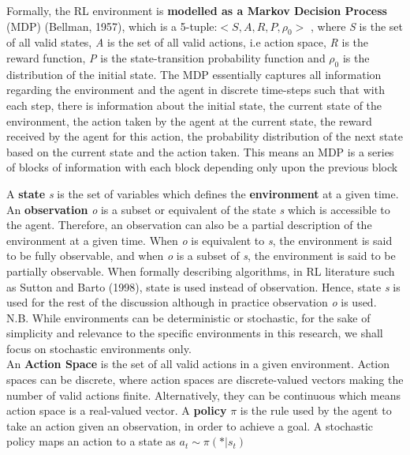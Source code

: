 Formally, the RL environment is \textbf{modelled as a Markov Decision Process} (MDP) (Bellman, 1957), which is a 5-tuple:$ <\textit{S},\textit{A},\textit{R},\textit{P},\rho_{0} > $ , where \textit{S} is the set of all valid states, \textit{A} is the set of all valid actions, i.e action space, \textit{R} is the reward function, \textit{P} is the state-transition probability function and $\rho_{0} $ is the distribution of the initial state. The MDP essentially captures all information regarding the environment and the agent in discrete time-steps such that with each step, there is information about the initial state, the current state of the environment, the action taken by the agent at the current state, the reward received by the agent for this action, the probability distribution of the next state based on the current state and the action taken. This means an MDP is a series of blocks of information with each block depending only upon the previous block 

A \textbf{state} \textit{s} is the set of variables which defines the \textbf{environment} at a given time. An \textbf{observation} \textit{o} is a subset or equivalent of the state \textit{s} which is accessible to the agent. Therefore, an observation can also be a partial description of the environment at a given time. When \textit{o} is equivalent to \textit{s}, the environment is said to be fully observable, and when \textit{o} is a subset of \textit{s}, the environment is said to be partially observable. When formally describing algorithms, in RL literature such as Sutton and Barto (1998), state is used instead of observation. Hence, state \textit{s} is used for the rest of the discussion although in practice observation \textit{o} is used. 
\\

N.B. While environments can be deterministic or stochastic, for the sake of simplicity and relevance to the specific environments in this research, we shall focus on stochastic environments only.
\\

An \textbf{Action Space} is the set of all valid actions in a given environment. Action spaces can be discrete, where action spaces are discrete-valued vectors making the number of valid actions finite. Alternatively, they can be continuous which means action space is a real-valued vector. A \textbf{policy} $\pi$ is the rule used by the agent to take an action given an observation, in order to achieve a goal. A stochastic policy maps an action to a state as 
$a_{t} \sim \pi  (*|s_{t})$

